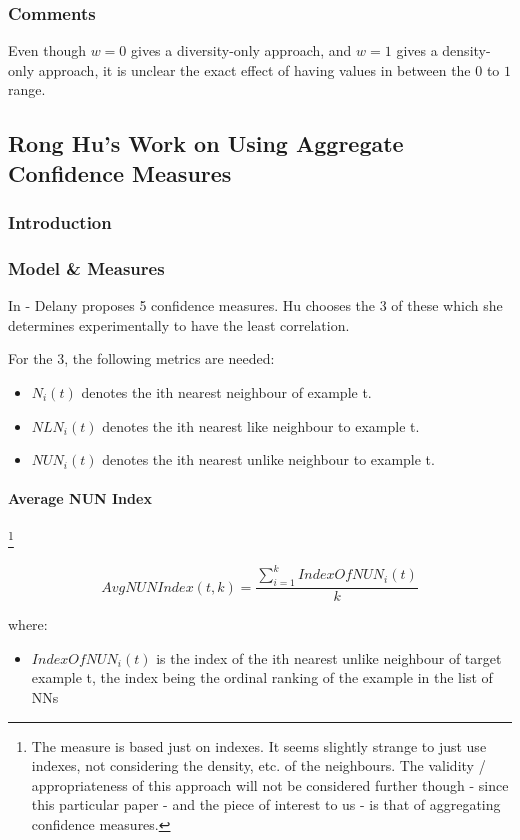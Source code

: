 \documentclass[a4paper,11pt]{report}
\begin{document}
\subsubsection{Comments}
Even though $w=0$ gives a diversity-only approach, and $w=1$ gives a density-only approach, it is unclear the exact effect of having values in between the $0$ to $1$ range.

\subsection{Rong Hu's Work on Using Aggregate Confidence Measures}
\subsubsection{Introduction}

\subsubsection{Model \& Measures}

In \citet{Delany2005} - Delany proposes 5 confidence measures. Hu chooses the 3 of these which she determines experimentally to have the least correlation.

For the 3, the following metrics are needed:
\begin{itemize} 
	\item $N_{i}(t)$ denotes the ith nearest neighbour of example t.
	\item $NLN_{i}(t)$ denotes the ith nearest like neighbour to example t.
	\item $NUN_{i}(t)$ denotes the ith nearest unlike neighbour to example t.
\end{itemize}

\paragraph{Average NUN Index} \footnote{The measure is based just on indexes. It seems slightly strange to just use indexes, not considering the density, etc. of the neighbours. The validity / appropriateness of this approach will not be considered further though - since this particular paper - and the piece of interest to us - is that of aggregating confidence measures.}

\[
AvgNUNIndex(t,k)=\frac{\sum_{i=1}^{k}IndexOfNUN_{i}(t)}{k}
\]

where:
\begin{itemize}
	\item $IndexOfNUN_{i}(t)$ is the index of the ith nearest unlike neighbour of target example t, the index being the ordinal ranking of the example in the list of NNs
\end{itemize}
\end{document}
